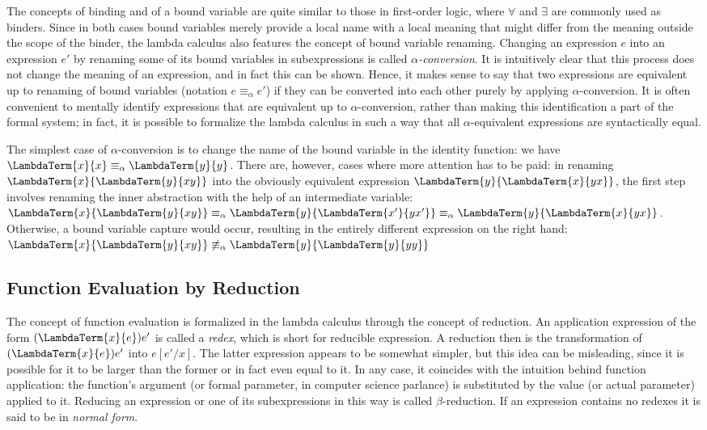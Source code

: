 The concepts of binding and of a bound variable are quite similar to those in
first-order logic, where $\forall$ and $\exists$ are commonly used as binders. Since in both
cases bound variables merely provide a local name with a local meaning that
might differ from the meaning outside the scope of the binder, the lambda
calculus also features the concept of bound variable renaming. Changing an
expression $e$ into an expression $e'$ by renaming some of its bound variables
in subexpressions is called \emph{$\alpha$-conversion}. It is intuitively clear that
this process does not change the meaning of an expression, and in fact this can
be shown. Hence, it makes sense to say that two expressions are equivalent up to
renaming of bound variables
(notation $e \equiv_\alpha e'$) if they can be converted into each other purely by applying
$\alpha$-conversion. It is often convenient to mentally identify expressions
that are equivalent up to $\alpha$-conversion, rather than making this
identification a part of the formal system; in fact, it is possible to formalize
the lambda calculus in such a way that all $\alpha$-equivalent expressions are
syntactically equal.
\begin{expl}
The simplest case of $\alpha$-conversion is to change the name of the bound variable
in the identity function: we have $\LambdaTerm{x}{x} \equiv_\alpha
\LambdaTerm{y}{y}$. There are, however, cases where more attention has to be
paid: in renaming $\LambdaTerm{x}{\LambdaTerm{y}{x y}}$ into the obviously
equivalent expression $\LambdaTerm{y}{\LambdaTerm{x}{y x}}$, the first step
involves renaming the inner abstraction with the help of an intermediate
variable: $\LambdaTerm{x}{\LambdaTerm{y}{x y}} \equiv_\alpha
\LambdaTerm{y}{\LambdaTerm{x'}{y x'}} \equiv_\alpha \LambdaTerm{y}{\LambdaTerm{x}{y
    x}}$. Otherwise, a bound variable capture would occur, resulting in the
entirely different expression on the right hand: 
$\LambdaTerm{x}{\LambdaTerm{y}{x y}} \not\equiv_\alpha \LambdaTerm{y}{\LambdaTerm{y}{y y}}$
\end{expl}


\subsection{Function Evaluation by Reduction}
\label{sec:function-evaluation}
The concept of function evaluation is formalized in the lambda calculus through
the concept of reduction. An application expression of the form
$(\LambdaTerm{x}{e}) e'$ is called a \emph{redex}, which is short for reducible
expression. A reduction then is the transformation of $(\LambdaTerm{x}{e}) e'$
into $e[e'/x]$. The latter expression appears to be somewhat simpler, but this
idea can be misleading, since it is possible for it to be larger than the former
or in fact even equal to it. In any case, it coincides with the intuition behind
function application: the function's argument (or formal parameter, in computer
science parlance) is substituted by the value (or actual parameter) applied to
it. Reducing an expression or one of its subexpressions in this way is called
$\beta$-reduction. If an expression contains no redexes it is said to be in
\emph{normal form}.

